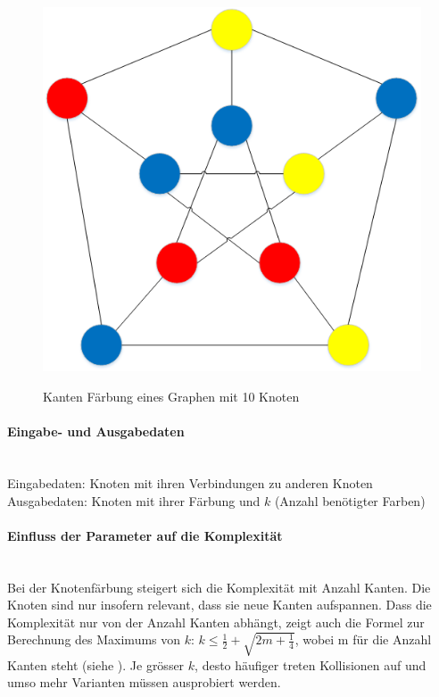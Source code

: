 \begin{figure}[ht]
{  \includegraphics[scale=0.5]{images/visio/graph_faerbung_correct.png}
  \label{fig:graph_faerbung_correct}
}
\caption[Kanten Färbung eines Graphen mit 10 Knoten]{Kanten Färbung eines Graphen mit 10 Knoten \selfmade{}}
\label{fig:graph_faerbung}
\end{figure}

\FloatBarrier 
	\paragraph{Eingabe- und Ausgabedaten}\mbox{}\\
	Eingabedaten: Knoten mit ihren Verbindungen zu anderen Knoten\\
	Ausgabedaten: Knoten mit ihrer Färbung und $k$ (Anzahl benötigter Farben)

	\paragraph{Einfluss der Parameter auf die Komplexität}\mbox{}\\
	Bei der Knotenfärbung steigert sich die Komplexität mit Anzahl Kanten. Die Knoten sind nur insofern relevant, dass sie neue Kanten aufspannen. Dass die Komplexität nur von der Anzahl Kanten 
	abhängt, zeigt auch die Formel zur Berechnung des Maximums von $k$: $k \le \frac{1}{2} + \sqrt{2m + \frac{1}{4}}$, wobei m für die Anzahl Kanten steht 
	(siehe \cite{seminar_rainer_graph}). Je grösser $k$, desto häufiger treten Kollisionen auf und umso mehr Varianten müssen ausprobiert werden.

